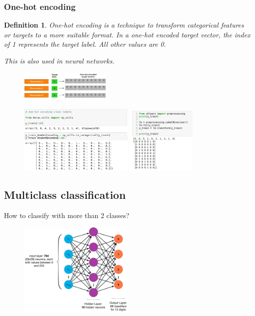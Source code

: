 \documentclass{article}
\newtheorem{theorem}{Definition}[section]
\begin{document}
\subsubsection{One-hot encoding}

\begin{theorem}
    One-hot encoding is a technique to transform categorical features or targets to a more suitable format. 
    In a one-hot encoded target vector, the index of 1 represents the target label. All other values are 0.

    This is also used in neural networks.
\end{theorem}

\begin{figure}[H]
    \centering
    \includegraphics[width=0.4\textwidth]{one-hot.png}
\end{figure}

\begin{figure}[H]
    \centering
    \includegraphics[width=0.5\textwidth]{one-hot2.png}
    \includegraphics[width=0.3\textwidth]{neural-onehot.png}
    \caption{}
\end{figure}

\subsection{Multiclass classification}


How to classify with more than 2 classes?

\begin{figure}[H]
    \centering
    \includegraphics[width=0.5\textwidth]{multiclass-classification.png}
    \caption{}
\end{figure}
\end{document}
